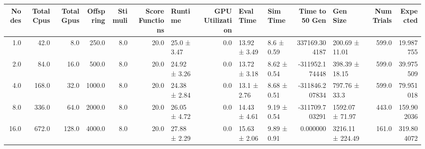\begin{tabular}{rrrrrrlrllrlrr}
\toprule
 Nodes &  Total Cpus &  Total Gpus &  Offspring &  Stimuli &  Score Functions &      Runtime &  GPU Utilization &    Eval Time &    Sim Time &  Time to 50 Gen &         Gen Size &  Num Trials &   Expected \\
\midrule
   1.0 &        42.0 &         8.0 &      250.0 &      8.0 &             20.0 &  25.0 ± 3.47 &              0.0 & 13.92 ± 3.49 &  8.6 ± 0.59 &   337169.304187 &   200.69 ± 11.01 &       599.0 &  19.987755 \\
   2.0 &        84.0 &        16.0 &      500.0 &      8.0 &             20.0 & 24.92 ± 3.26 &              0.0 & 13.72 ± 3.18 & 8.62 ± 0.54 &  -311952.174448 &   398.39 ± 18.15 &       599.0 &  39.975509 \\
   4.0 &       168.0 &        32.0 &     1000.0 &      8.0 &             20.0 & 24.38 ± 2.84 &              0.0 &  13.1 ± 2.76 & 8.68 ± 0.51 &  -311846.207834 &    797.76 ± 33.3 &       599.0 &  79.951018 \\
   8.0 &       336.0 &        64.0 &     2000.0 &      8.0 &             20.0 & 26.05 ± 4.72 &              0.0 & 14.43 ± 4.61 & 9.19 ± 0.54 &  -311709.703291 &  1592.07 ± 71.97 &       443.0 & 159.902036 \\
  16.0 &       672.0 &       128.0 &     4000.0 &      8.0 &             20.0 & 27.88 ± 2.29 &              0.0 & 15.63 ± 2.06 & 9.89 ± 0.91 &        0.000000 & 3216.11 ± 224.49 &       161.0 & 319.804072 \\
\bottomrule
\end{tabular}
